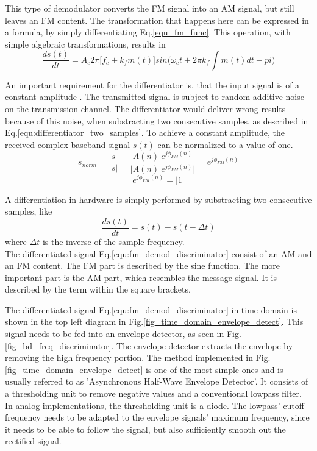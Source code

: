 This type of demodulator converts the FM signal into an AM signal, but still leaves an FM content.
The transformation that happens here can be expressed in a formula, by simply differentiating Eq.\ref{equ_fm_func}.
This operation, with simple algebraic transformations, results in
\begin{equation}
  \frac{d s(t)}{dt} = A_c 2 \pi \Big[f_c + k_f m(t) \Big] sin \Big(\omega_c t + 2 \pi k_f \int m(t) dt -pi \Big)
  \label{equ:fm_demod_discriminator}
\end{equation}

An important requirement for the differentiator is, that the input signal is of a constant amplitude \cite{ref_schnyder_haller}.
The transmitted signal is subject to random additive noise on the transmission channel.
The differentiator would deliver wrong results because of this noise, when substracting two consecutive samples, as described in Eq.\ref{equ:differentiator_two_samples}.
To achieve a constant amplitude, the received complex baseband signal $s(t)$ can be normalized to a value of one.
\begin{equation}
  s_{norm} = \frac{s}{|s|} = \frac{A(n)\ e^{j\phi_{FM}(n)}}{|{A(n)\ e^{j\phi_{FM}(n)}|}} = e^{j\phi_{FM}(n)}
\end{equation}
\begin{equation}
  e^{j\phi_{FM}(n)} = |1|
\end{equation}

A differentiation in hardware is simply performed by substracting two consecutive samples, like
\begin{equation}
  \frac{d s(t)}{dt} = s(t) - s(t-\Delta t)
  \label{equ:differentiator_two_samples}
\end{equation}
where $\Delta t$ is the inverse of the sample frequency.\\ %

The differentiated signal Eq.\ref{equ:fm_demod_discriminator} consist of an AM and an FM content.
The FM part is described by the sine function.
The more important part is the AM part, which resembles the message signal.
It is described by the term within the square brackets.

The differentiated signal Eq.\ref{equ:fm_demod_discriminator} in time-domain is shown in the top left diagram in Fig.\ref{fig_time_domain_envelope_detect}.
This signal needs to be fed into an envelope detector, as seen in Fig.\ref{fig_bd_freq_discriminator}.
The envelope detector extracts the envelope by removing the high frequency portion.
The method implemented in Fig.\ref{fig_time_domain_envelope_detect} is one of the most simple ones and is usually referred to as 'Asynchronous Half-Wave Envelope Detector'\cite{ref_envelope_detector}.
It consists of a thresholding unit to remove negative values and a conventional lowpass filter.
In analog implementations, the thresholding unit is a diode.
The lowpass' cutoff frequency needs to be adapted to the envelope signals' maximum frequency, since it needs to be able to follow the signal, but also sufficiently smooth out the rectified signal.

